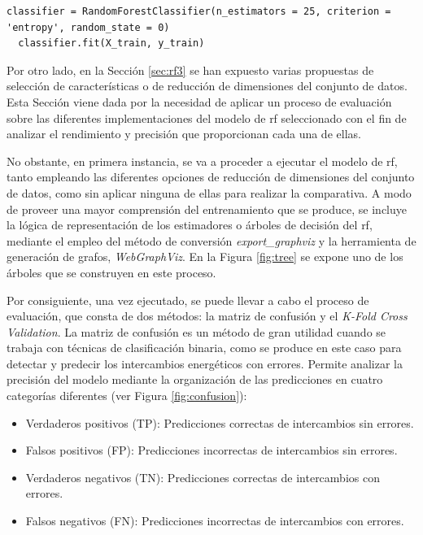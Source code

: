 \vspace{3mm}

\begin{lstlisting}[style=Python, caption={Clasificador RF seleccionado}]
  classifier = RandomForestClassifier(n_estimators = 25, criterion = 'entropy', random_state = 0) 
  classifier.fit(X_train, y_train)
\end{lstlisting}
  
\vspace{3mm}

Por otro lado, en la Sección \ref{sec:rf3} se han expuesto varias propuestas de selección de características o de reducción de dimensiones del conjunto de datos. Esta Sección viene dada por la necesidad de aplicar un proceso de evaluación sobre las diferentes implementaciones del modelo de \gls{rf} seleccionado con el fin de analizar el rendimiento y precisión que proporcionan cada una de ellas. 

\vspace{3mm}

No obstante, en primera instancia, se va a proceder a ejecutar el modelo de \gls{rf}, tanto empleando las diferentes opciones de reducción de dimensiones del conjunto de datos, como sin aplicar ninguna de ellas para realizar la comparativa. A modo de proveer una mayor comprensión del entrenamiento que se produce, se incluye la lógica de representación de los estimadores o árboles de decisión del \gls{rf}, mediante el empleo del método de conversión \textit{export\_graphviz} \cite{graphviz2} y la herramienta de generación de grafos, \textit{WebGraphViz}. En la Figura \ref{fig:tree} se expone uno de los árboles que se construyen en este proceso.

\vspace{3mm}

Por consiguiente, una vez ejecutado, se puede llevar a cabo el proceso de evaluación, que consta de dos métodos: la matriz de confusión y el \textit{K-Fold Cross Validation}. La matriz de confusión \cite{cm} es un método de gran utilidad cuando se trabaja con técnicas de clasificación binaria, como se produce en este caso para detectar y predecir los intercambios energéticos con errores. Permite analizar la precisión del modelo mediante la organización de las predicciones en cuatro categorías diferentes (ver Figura \ref{fig:confusion}): 

\begin{itemize}
  \item Verdaderos positivos (TP): Predicciones correctas de intercambios sin errores.
  \item Falsos positivos (FP): Predicciones incorrectas de intercambios sin errores.
  \item Verdaderos negativos (TN): Predicciones correctas de intercambios con errores.
  \item Falsos negativos (FN): Predicciones incorrectas de intercambios con errores.
\end{itemize}

